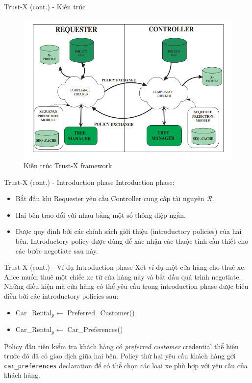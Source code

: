 \documentclass[11pt]{beamer}
\begin{document}
\begin{frame}{Trust-X (cont.) - Kiến trúc}
\begin{figure}
\centering
\includegraphics[scale=.5]{img/trust-x-architecture.PNG}
\caption{Kiến trúc Trust-X framework}
\label{fig:trust_x_architecture}
\end{figure}
\end{frame}

\begin{frame}{Trust-X (cont.) - Introduction phase}
Introduction phase:
\begin{itemize}
\item Bắt đầu khi Requester yêu cầu Controller cung cấp tài nguyên $\mathcal{R}$. 
\item Hai bên trao đổi với nhau bằng một số thông điệp ngắn.
\item Được quy định bởi các chính sách giới thiệu (introductory policies) của hai bên. Introductory policy được dùng để xác nhận các thuộc tính cần thiết cho các bước negotiate sau này.
\end{itemize}
\end{frame}

\begin{frame}{Trust-X (cont.) - Ví dụ Introduction phase}
Xét ví dụ một cửa hàng cho thuê xe. Alice muốn thuê một chiếc xe từ cửa hàng này và bắt đầu quá trình negotiate. Những điều kiện mà cửa hàng có thể yêu cầu trong introduction phase được biểu diễn bởi các introductory policies sau:
\begin{itemize}
\item Car\_Rental$_{p} \leftarrow $ Preferred\_Customer()
\item Car\_Rental$_{p} \leftarrow $ Car\_Preferences()
\end{itemize}
Policy đầu tiên kiểm tra khách hàng có \textit{preferred customer} credential thể hiện trước đó đã có giao dịch giữa hai bên. Policy thứ hai yêu cầu khách hàng gởi \texttt{car\_preferences} declaration để có thể chọn các loại xe phù hợp với yêu cầu của khách hàng.
\end{frame}
\end{document}
